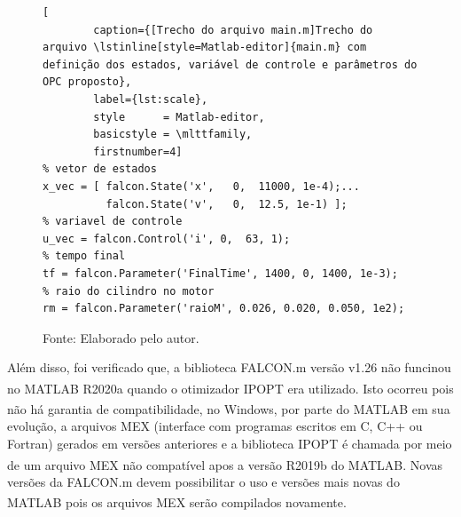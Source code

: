 \begin{figure}[h]
    \begin{lstlisting}[
        caption={[Trecho do arquivo main.m]Trecho do arquivo \lstinline[style=Matlab-editor]{main.m} com definição dos estados, variável de controle e parâmetros do OPC proposto}, 
        label={lst:scale},
        style      = Matlab-editor,
        basicstyle = \mlttfamily,
        firstnumber=4]
% vetor de estados
x_vec = [ falcon.State('x',   0,  11000, 1e-4);...
          falcon.State('v',   0,  12.5, 1e-1) ];
% variavel de controle
u_vec = falcon.Control('i', 0,  63, 1);
% tempo final
tf = falcon.Parameter('FinalTime', 1400, 0, 1400, 1e-3);
% raio do cilindro no motor
rm = falcon.Parameter('raioM', 0.026, 0.020, 0.050, 1e2);
    \end{lstlisting}
    \caption*{\footnotesize{Fonte: Elaborado pelo autor.}}
\end{figure}

Além disso, foi verificado que, a biblioteca FALCON.m versão v1.26 não funcinou no MATLAB\textsuperscript{\textregistered} R2020a quando o otimizador IPOPT era utilizado.
Isto ocorreu pois não há garantia de compatibilidade, no Windows, por parte do MATLAB\textsuperscript{\textregistered} em sua evolução, a arquivos MEX (interface com programas escritos em C, C++ ou Fortran) gerados em versões 
anteriores e a biblioteca IPOPT é chamada por meio de um arquivo MEX não compatível apos a versão R2019b do MATLAB\textsuperscript{\textregistered}. Novas versões da FALCON.m
devem possibilitar o uso e versões mais novas do MATLAB\textsuperscript{\textregistered} pois os arquivos MEX serão compilados novamente.




\clearpage